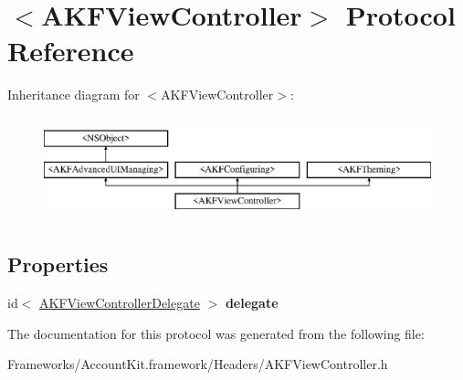\hypertarget{protocol_a_k_f_view_controller-p}{}\section{$<$A\+K\+F\+View\+Controller$>$ Protocol Reference}
\label{protocol_a_k_f_view_controller-p}
Inheritance diagram for $<$A\+K\+F\+View\+Controller$>$\+:\begin{figure}[H]
\begin{center}
\leavevmode
\includegraphics[height=3.000000cm]{protocol_a_k_f_view_controller-p}
\end{center}
\end{figure}
\subsection*{Properties}
\begin{DoxyCompactItemize}
\item 
\hypertarget{protocol_a_k_f_view_controller-p_a7a56b45974f2bbd3238b1e8bf0c7de10}{}id$<$ \hyperlink{protocol_a_k_f_view_controller_delegate-p}{A\+K\+F\+View\+Controller\+Delegate} $>$ {\bfseries delegate}\label{protocol_a_k_f_view_controller-p_a7a56b45974f2bbd3238b1e8bf0c7de10}

\end{DoxyCompactItemize}


The documentation for this protocol was generated from the following file\+:\begin{DoxyCompactItemize}
\item 
Frameworks/\+Account\+Kit.\+framework/\+Headers/A\+K\+F\+View\+Controller.\+h\end{DoxyCompactItemize}
